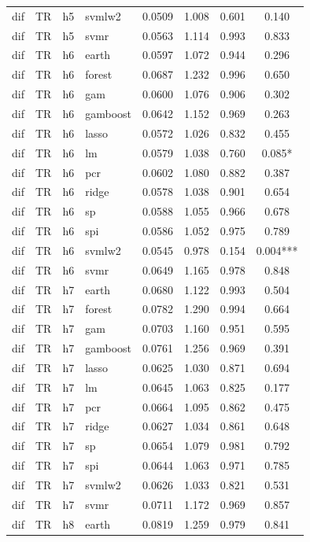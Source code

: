 \begin{ThreePartTable}
\begin{longtable}[t]{llclcccc}
dif & TR & h5 & svmlw2 & 0.0509 & 1.008 & 0.601 & 0.140\\
dif & TR & h5 & svmr & 0.0563 & 1.114 & 0.993 & 0.833\\
\addlinespace
dif & TR & h6 & earth & 0.0597 & 1.072 & 0.944 & 0.296\\
dif & TR & h6 & forest & 0.0687 & 1.232 & 0.996 & 0.650\\
dif & TR & h6 & gam & 0.0600 & 1.076 & 0.906 & 0.302\\
dif & TR & h6 & gamboost & 0.0642 & 1.152 & 0.969 & 0.263\\
dif & TR & h6 & lasso & 0.0572 & 1.026 & 0.832 & 0.455\\
dif & TR & h6 & lm & 0.0579 & 1.038 & 0.760 & 0.085*\\
dif & TR & h6 & pcr & 0.0602 & 1.080 & 0.882 & 0.387\\
dif & TR & h6 & ridge & 0.0578 & 1.038 & 0.901 & 0.654\\
dif & TR & h6 & sp & 0.0588 & 1.055 & 0.966 & 0.678\\
dif & TR & h6 & spi & 0.0586 & 1.052 & 0.975 & 0.789\\
dif & TR & h6 & svmlw2 & 0.0545 & 0.978 & 0.154 & 0.004***\\
dif & TR & h6 & svmr & 0.0649 & 1.165 & 0.978 & 0.848\\
\addlinespace
dif & TR & h7 & earth & 0.0680 & 1.122 & 0.993 & 0.504\\
dif & TR & h7 & forest & 0.0782 & 1.290 & 0.994 & 0.664\\
dif & TR & h7 & gam & 0.0703 & 1.160 & 0.951 & 0.595\\
dif & TR & h7 & gamboost & 0.0761 & 1.256 & 0.969 & 0.391\\
dif & TR & h7 & lasso & 0.0625 & 1.030 & 0.871 & 0.694\\
dif & TR & h7 & lm & 0.0645 & 1.063 & 0.825 & 0.177\\
dif & TR & h7 & pcr & 0.0664 & 1.095 & 0.862 & 0.475\\
dif & TR & h7 & ridge & 0.0627 & 1.034 & 0.861 & 0.648\\
dif & TR & h7 & sp & 0.0654 & 1.079 & 0.981 & 0.792\\
dif & TR & h7 & spi & 0.0644 & 1.063 & 0.971 & 0.785\\
dif & TR & h7 & svmlw2 & 0.0626 & 1.033 & 0.821 & 0.531\\
dif & TR & h7 & svmr & 0.0711 & 1.172 & 0.969 & 0.857\\
\addlinespace
dif & TR & h8 & earth & 0.0819 & 1.259 & 0.979 & 0.841\\

\end{longtable}
\end{ThreePartTable}
